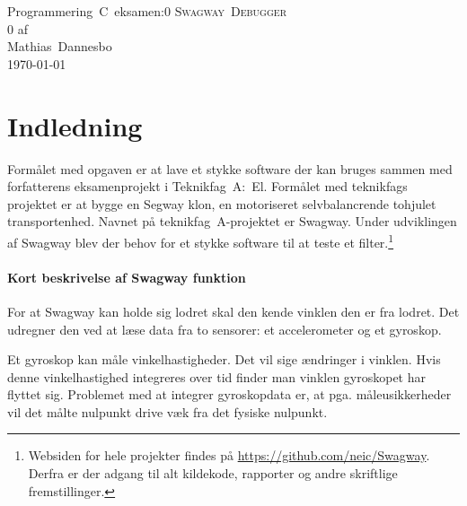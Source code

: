 \documentclass[a4paper,oneside,article,danish,table]{memoir}
\newcommand{\authorvar}{Mathias~Dannesbo}
\newcommand{\pretitlevar}{Programmering~C~eksamen:}
\newcommand{\titlevar}{Swagway~Debugger}
\newcommand{\subtitlevar}{0}
\newcommand{\datevar}{\today}
\begin{document}

\begin{center}
  \if\pretitlevar 0
  \else{\Large\pretitlevar\\} \fi
  \textsc{\HUGE\titlevar\\}
  \if\subtitlevar 0
  \else {\Large\subtitlevar\\} \fi
  {\LARGE 
  af\\
   \authorvar}\\
 \datevar\\
\end{center}
\begin{abstract}
This journal is a walk-through of the source code of Swagway Debugger, a Windows application for debugging and tuning Kalman-filters, on balancing robots and Segway clones. It is made as a part of the Swagway project.
\end{abstract}
\thispagestyle{empty}

\chapter{Indledning}
Formålet med opgaven er at lave et stykke software der kan bruges sammen med forfatterens eksamenprojekt i Teknikfag~A:~El. Formålet med teknikfags projektet er at bygge en Segway klon, en motoriseret selvbalancrende tohjulet transportenhed. Navnet på teknikfag~A-projektet er Swagway. Under udviklingen af Swagway blev der behov for et stykke software til at teste et filter.\footnote{Websiden for hele projekter findes på \url{https://github.com/neic/Swagway}. Derfra er der adgang til alt kildekode, rapporter og andre skriftlige fremstillinger.}

\subsubsection{Kort beskrivelse af Swagway funktion}
For at Swagway kan holde sig lodret skal den kende vinklen den er fra lodret. Det udregner den ved at læse data fra to sensorer: et accelerometer og et gyroskop.

Et gyroskop kan måle vinkelhastigheder. Det vil sige ændringer i vinklen. Hvis denne vinkelhastighed integreres over tid finder man vinklen gyroskopet har flyttet sig. Problemet med at integrer gyroskopdata er, at pga. måleusikkerheder vil det målte nulpunkt drive væk fra det fysiske nulpunkt.
\end{document}
